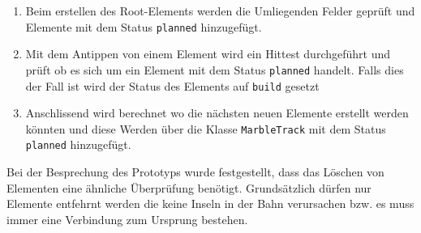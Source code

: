 \begin{description}
	\begin{enumerate}
		\item Beim erstellen des Root-Elements werden die Umliegenden Felder geprüft und Elemente mit dem Status \texttt{planned} hinzugefügt.
		\item Mit dem Antippen von einem Element wird ein Hittest durchgeführt und prüft ob es sich um ein Element mit dem Status \texttt{planned} handelt. Falls dies der Fall ist wird der Status des Elements auf \texttt{build} gesetzt
		\item Anschlissend wird berechnet wo die nächsten neuen Elemente erstellt werden könnten und diese Werden über die Klasse \texttt{MarbleTrack} mit dem Status \texttt{planned} hinzugefügt.
	\end{enumerate}

	Bei der Besprechung des Prototyps wurde festgestellt, dass das Löschen von Elementen eine ähnliche Überprüfung benötigt. Grundsätzlich dürfen nur Elemente entfehrnt werden die keine Inseln in der Bahn verursachen bzw. es muss immer eine Verbindung zum Ursprung bestehen.

\end{description}
